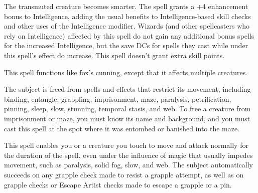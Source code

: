 \begin{multicols}{2}
\begin{small}

\noindent The transmuted creature becomes smarter. The spell grants a +4 enhancement bonus to Intelligence, adding the usual benefits to Intelligence-based skill checks and other uses of the Intelligence modifier. Wizards (and other spellcasters who rely on Intelligence) affected by this spell do not gain any additional bonus spells for the increased Intelligence, but the save DCs for spells they cast while under this spell's effect do increase. This spell doesn't grant extra skill points.


\noindent This spell functions like fox's cunning, except that it affects multiple creatures.

\noindent The subject is freed from spells and effects that restrict its movement, including binding, entangle, grappling, imprisonment, maze, paralysis, petrification, pinning, sleep, slow, stunning, temporal stasis, and web. To free a creature from imprisonment or maze, you must know its name and background, and you must cast this spell at the spot where it was entombed or banished into the maze.

\noindent This spell enables you or a creature you touch to move and attack normally for the duration of the spell, even under the influence of magic that usually impedes movement, such as paralysis, solid fog, slow, and web. The subject automatically succeeds on any grapple check made to resist a grapple attempt, as well as on grapple checks or Escape Artist checks made to escape a grapple or a pin.


\end{small}
\end{multicols}

